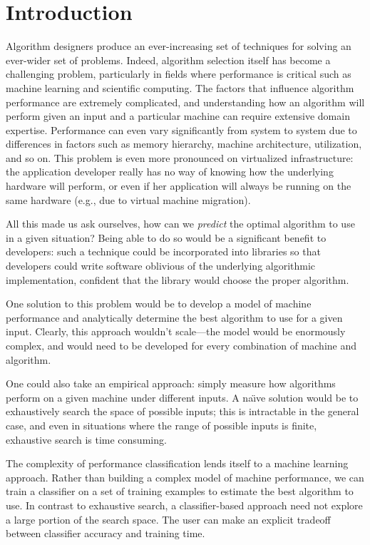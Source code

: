 \section{Introduction}
Algorithm designers produce an ever-increasing set of techniques for solving an ever-wider set of problems.
Indeed, algorithm selection itself has become a challenging problem, particularly in fields where performance is critical such as machine learning and scientific computing.
The factors that influence algorithm performance are extremely complicated, and understanding how an algorithm will perform given an input and a particular machine can require extensive domain expertise.
Performance can even vary significantly from system to system due to differences in factors such as memory hierarchy, machine architecture, utilization, and so on.
This problem is even more pronounced on virtualized infrastructure: the application developer really has no way of knowing how the underlying hardware will perform, or even if her application will always be running on the same hardware (e.g., due to virtual machine migration).

All this made us ask ourselves, how can we \emph{predict} the optimal algorithm to use in a given situation?
Being able to do so would be a significant benefit to developers: such a technique could be incorporated into libraries so that developers could write software oblivious of the underlying algorithmic implementation, confident that the library would choose the proper algorithm.

One solution to this problem would be to develop a model of machine performance and analytically determine the best algorithm to use for a given input.
Clearly, this approach wouldn't scale---the model would be enormously complex, and would need to be developed for every combination of machine and algorithm.

One could also take an empirical approach: simply measure how algorithms perform on a given machine under different inputs.
A na\"{\i}ve solution would be to exhaustively search the space of possible inputs; this is intractable in the general case, and even in situations where the range of possible inputs is finite, exhaustive search is time consuming.

The complexity of performance classification lends itself to a machine learning approach.
Rather than building a complex model of machine performance, we can train a classifier on a set of training examples to estimate the best algorithm to use.
In contrast to exhaustive search, a classifier-based approach need not explore a large portion of the search space.
The user can make an explicit tradeoff between classifier accuracy and training time.

